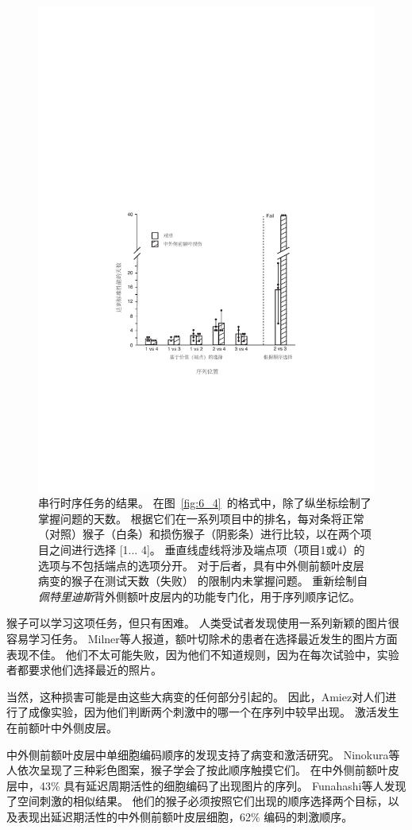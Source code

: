 \begin{figure}
	\centering
	\includegraphics[width=0.7\linewidth]{chap6/6_5}
	\caption{串行时序任务的结果。
		在图~\ref{fig:6_4}~的格式中，除了纵坐标绘制了掌握问题的天数。
		根据它们在一系列项目中的排名，每对条将正常（对照）猴子（白条）和损伤猴子（阴影条）进行比较，以在两个项目之间进行选择 [1... 4]。
		垂直线虚线将涉及端点项（项目1或4）的选项与不包括端点的选项分开。
		对于后者，具有中外侧前额叶皮层病变的猴子在测试天数（失败） 的限制内未掌握问题。
		重新绘制自\textit{佩特里迪斯}背外侧额叶皮层内的功能专门化，用于序列顺序记忆\cite{petrides1991functional}。}
	\label{fig:6_5}
\end{figure}


猴子可以学习这项任务，但只有困难。
人类受试者发现使用一系列新颖的图片很容易学习任务。
Milner等人\cite{milner1985frontal}报道，额叶切除术的患者在选择最近发生的图片方面表现不佳。
他们不太可能失败，因为他们不知道规则，因为在每次试验中，实验者都要求他们选择最近的照片。


当然，这种损害可能是由这些大病变的任何部分引起的。
因此，Amiez\cite{amiez2007selective}对人们进行了成像实验，因为他们判断两个刺激中的哪一个在序列中较早出现。
激活发生在前额叶中外侧皮层。


中外侧前额叶皮层中单细胞编码顺序的发现支持了病变和激活研究。
Ninokura等人\cite{ninokura2003representation}依次呈现了三种彩色图案，猴子学会了按此顺序触摸它们。
在中外侧前额叶皮层中，43\% 具有延迟周期活性的细胞编码了出现图片的序列。
Funahashi等人\cite{funahashi1997delay}发现了空间刺激的相似结果。
他们的猴子必须按照它们出现的顺序选择两个目标，以及表现出延迟期活性的中外侧前额叶皮层细胞，62\% 编码的刺激顺序。


